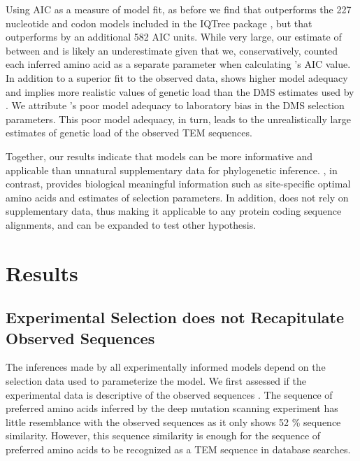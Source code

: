 \documentclass[fleqn,letterpaper]{article}
\begin{document}
Using AIC as a measure of model fit, as before we find that \phydms outperforms the 227 nucleotide and codon models included in the IQTree package \citep{bloom2014, bloom2017}, but that \selac outperforms \phydms by an additional 582 AIC units.
While very large, our estimate of \DeltaAIC between \selac and \phydms is likely an underestimate given that we, conservatively, counted each inferred amino acid as a separate parameter when calculating \selac's AIC value.
In addition to a superior fit to the observed data, \selac shows higher model adequacy and implies more realistic values of genetic load than the DMS estimates used by \phydms.
We attribute \phydms's poor model adequacy to laboratory bias in the DMS selection parameters.
This poor model adequacy, in turn, leads to the unrealistically large estimates of genetic load of the observed TEM sequences.

Together, our results indicate that models can be more informative and applicable than unnatural supplementary data for phylogenetic inference.
\selac, in contrast, provides biological meaningful information such as site-specific optimal amino acids and estimates of selection parameters.
In addition, \selac does not rely on supplementary data, thus making it applicable to any protein coding sequence alignments, and can be expanded to test other hypothesis.

\section{Results}
\subsection{Experimental Selection does not Recapitulate Observed Sequences}
The inferences made by all experimentally informed models depend on the selection data used to parameterize the model.
We first assessed if the experimental data is descriptive of the observed sequences \citet{bloom2017}.
The sequence of preferred amino acids inferred by the deep mutation scanning experiment has little resemblance with the observed sequences as it only shows 52 \% sequence similarity.
However, this sequence similarity is enough for the sequence of preferred amino acids to be recognized as a TEM sequence in database searches.
\end{document}

